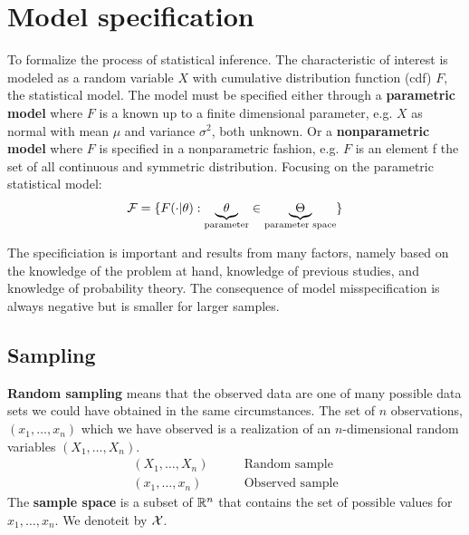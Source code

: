 \section{Model specification}

To formalize the process of statistical inference.
The characteristic of interest is modeled as a random variable $X$ with cumulative distribution function (cdf) $F$, the statistical model.
The model must be specified either through a \textbf{parametric model} where $F$ is a known up to a finite dimensional parameter, 
e.g. $X$ as normal with mean $\mu$ and variance $\sigma^2$, both unknown.
Or a \textbf{nonparametric model} where $F$ is specified in a nonparametric fashion, e.g. $F$ is an element f the set of all continuous and symmetric distribution.
Focusing on the parametric statistical model:
\begin{equation*}
    \mathcal{F} = \{F(\cdot|\theta):\underbrace{\theta}_{\text{parameter}}\in\underbrace{\Theta}_{\text{parameter space}}\}
\end{equation*}


The specificiation is important and results from many factors, namely based on the knowledge of the problem at hand, knowledge of previous studies, and knowledge of probability theory.
The consequence of model misspecification is always negative but is smaller for larger samples.

\subsection{Sampling}

\textbf{Random sampling} means that the observed data are one of many possible data sets we could have obtained in the same circumstances.
The set of $n$ observations, $(x_1,\ldots,x_n)$ which we have observed is a realization of an $n$-dimensional random variables $(X_1,\ldots,X_n)$.
\begin{equation*}
    \begin{split}
        (X_1,\ldots,X_n) & \qquad\text{Random sample}\\
        (x_1,\ldots,x_n) & \qquad\text{Observed sample}
    \end{split}
\end{equation*}
The \textbf{sample space} is a subset of $\mathbb{R}^n$ that contains the set of possible values for $x_1,\ldots,x_n$. We denoteit by $\mathcal{X}$.

